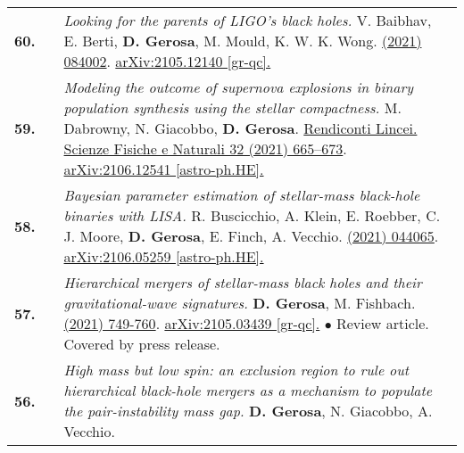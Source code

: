 {\begin{longtable}{rp{0.3cm}p{15.8cm}}
%
\textbf{60.} & & \textit{Looking for the parents of LIGO's black holes.}
\newline{}
V. Baibhav, E. Berti, \textbf{D. Gerosa}, M. Mould, K. W. K. Wong.
\newline{}
\href{https://journals.aps.org/prd/abstract/10.1103/PhysRevD.104.084002}{\prd 104 (2021) 084002}. \href{https://arxiv.org/abs/2105.12140}{arXiv:2105.12140 [gr-qc].}
\vspace{0.09cm}\\
%
\textbf{59.} & & \textit{Modeling the outcome of supernova explosions in binary population synthesis using the stellar compactness.}
\newline{}
M. Dabrowny, N. Giacobbo, \textbf{D. Gerosa}.
\newline{}
\href{https://link.springer.com/article/10.1007/s12210-021-01019-8}{Rendiconti Lincei. Scienze Fisiche e Naturali 32 (2021) 665–673}. \href{https://arxiv.org/abs/2106.12541}{arXiv:2106.12541 [astro-ph.HE].}
\vspace{0.09cm}\\
%
\textbf{58.} & & \textit{Bayesian parameter estimation of stellar-mass black-hole binaries with LISA.}
\newline{}
R. Buscicchio, A. Klein, E. Roebber, C. J. Moore, \textbf{D. Gerosa}, E. Finch, A. Vecchio.
\newline{}
\href{https://journals.aps.org/prd/abstract/10.1103/PhysRevD.104.044065}{\prd 104 (2021) 044065}. \href{https://arxiv.org/abs/2106.05259}{arXiv:2106.05259 [astro-ph.HE].}
\vspace{0.09cm}\\
%
\textbf{57.} & & \textit{Hierarchical mergers of stellar-mass black holes and their gravitational-wave signatures.}
\newline{}
\textbf{D. Gerosa}, M. Fishbach.
\newline{}
\href{https://www.nature.com/articles/s41550-021-01398-w}{\natastro 5 (2021) 749-760}. \href{https://arxiv.org/abs/2105.03439}{arXiv:2105.03439 [gr-qc].}
\newline{}
\textcolor{color1}{$\bullet$} Review article. Covered by press release.
\vspace{0.09cm}\\
%
\textbf{56.} & & \textit{High mass but low spin: an exclusion region to rule out hierarchical black-hole mergers as a mechanism to populate the pair-instability mass gap.}
\newline{}
\textbf{D. Gerosa}, N. Giacobbo, A. Vecchio.
\newline{}

\end{longtable}}
